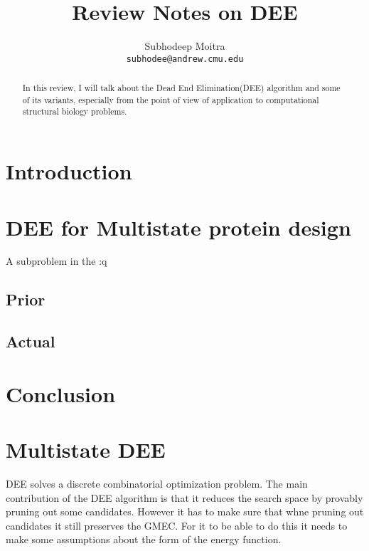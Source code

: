 \documentclass[a4]{article}
\begin{document}
\title{Review Notes on DEE}

\author{Subhodeep Moitra \\ {\tt subhodee@andrew.cmu.edu}}

\maketitle

\begin{abstract}
In this review, I will talk about the Dead End Elimination(DEE) algorithm and some of its variants, especially from the point of view of application to computational structural biology problems.  
\end{abstract}

\section{Introduction}


\section{DEE for Multistate protein design}
A subproblem in the :q

\subsection{Prior}


\subsection{Actual}


\section{Conclusion}




\pagebreak
\newpage

\appendix
\section{Multistate DEE}
DEE solves a discrete combinatorial optimization problem. The main contribution of the DEE algorithm is that it reduces the search space by provably pruning out some candidates. However it has to make sure that whne pruning out candidates it still preserves the GMEC. For it to be able to do this it needs to make some assumptions about the form of the energy function. 
\end{document}
